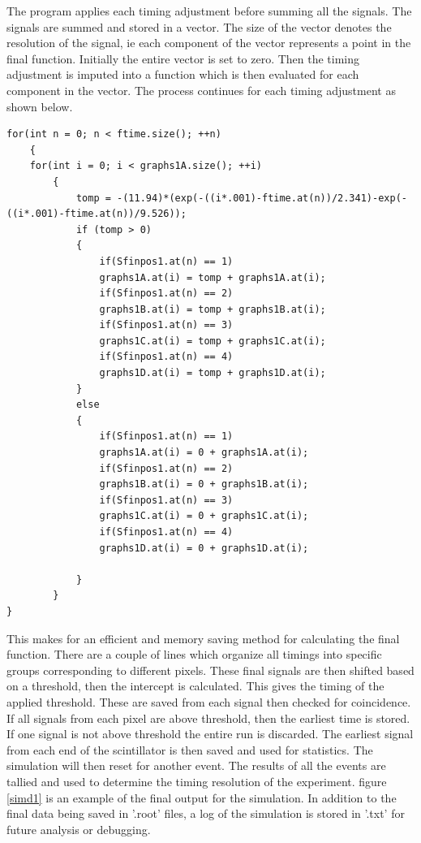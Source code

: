 \documentclass[paper=a4, fontsize=11pt]{scrartcl}
\numberwithin{equation}{section}		%
\numberwithin{figure}{section}			%
\numberwithin{table}{section}				%
\begin{document}
The program applies each timing adjustment before summing all the signals. The signals are summed and stored in a vector. The size of the vector denotes the resolution of the signal, ie each component of the vector represents a point in the final function. Initially the entire vector is set to zero. Then the timing adjustment is imputed into a function which is then evaluated for each component in the vector. The process continues for each timing adjustment as shown below.

\begin{lstlisting}
for(int n = 0; n < ftime.size(); ++n)
	{
	for(int i = 0; i < graphs1A.size(); ++i)
		{
			tomp = -(11.94)*(exp(-((i*.001)-ftime.at(n))/2.341)-exp(-((i*.001)-ftime.at(n))/9.526));
			if (tomp > 0)
			{
				if(Sfinpos1.at(n) == 1)
				graphs1A.at(i) = tomp + graphs1A.at(i);
				if(Sfinpos1.at(n) == 2)
				graphs1B.at(i) = tomp + graphs1B.at(i);
				if(Sfinpos1.at(n) == 3)
				graphs1C.at(i) = tomp + graphs1C.at(i);
				if(Sfinpos1.at(n) == 4)
				graphs1D.at(i) = tomp + graphs1D.at(i);
			}
			else
			{
				if(Sfinpos1.at(n) == 1)
				graphs1A.at(i) = 0 + graphs1A.at(i);
				if(Sfinpos1.at(n) == 2)
				graphs1B.at(i) = 0 + graphs1B.at(i);
				if(Sfinpos1.at(n) == 3)
				graphs1C.at(i) = 0 + graphs1C.at(i);
				if(Sfinpos1.at(n) == 4)
				graphs1D.at(i) = 0 + graphs1D.at(i);
			
			}
		}
}
\end{lstlisting}

 This makes for an efficient and memory saving method for calculating the final function. There are a couple of lines which organize all timings into specific groups corresponding to different pixels. These final signals are then shifted based on a threshold, then the intercept is calculated. This gives the timing of the applied threshold. These are saved from each signal then checked for coincidence. If all signals from each pixel are above threshold, then the earliest time is stored. If one signal is not above threshold the entire run is discarded. The earliest signal from each end of the scintillator is then saved and used for statistics. The simulation will then reset for another event. The results of all the events are tallied and used to determine the timing resolution of the experiment. figure \ref{simd1}  is an example of the final output for the simulation. In addition to the final data being saved in '.root' files, a log of the simulation is stored in '.txt' for future analysis or debugging.
\end{document}

